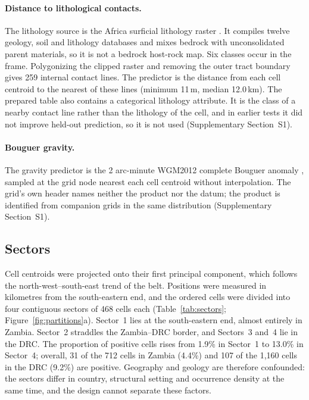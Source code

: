 \documentclass[pdflatex,sn-basic]{sn-jnl}%
\begin{document}
\paragraph{Distance to lithological contacts.}
The lithology source is the Africa surficial lithology raster \citep{SayreKabuchanga2015}. It compiles twelve geology, soil and lithology databases and mixes bedrock with unconsolidated parent materials, so it is not a bedrock host-rock map. Six classes occur in the frame. Polygonizing the clipped raster and removing the outer tract boundary gives 259 internal contact lines. The predictor is the distance from each cell centroid to the nearest of these lines (minimum 11\,m, median 12.0\,km). The prepared table also contains a categorical lithology attribute. It is the class of a nearby contact line rather than the lithology of the cell, and in earlier tests it did not improve held-out prediction, so it is not used (Supplementary Section~S1).

\paragraph{Bouguer gravity.}
The gravity predictor is the 2 arc-minute WGM2012 complete Bouguer anomaly \citep{BGIWGM2012}, sampled at the grid node nearest each cell centroid without interpolation. The grid's own header names neither the product nor the datum; the product is identified from companion grids in the same distribution (Supplementary Section~S1).

\subsection{Sectors}
\label{sec:sectors}

Cell centroids were projected onto their first principal component, which follows the north-west--south-east trend of the belt. Positions were measured in kilometres from the south-eastern end, and the ordered cells were divided into four contiguous sectors of 468 cells each (Table~\ref{tab:sectors}; Figure~\ref{fig:partitions}a). Sector~1 lies at the south-eastern end, almost entirely in Zambia. Sector~2 straddles the Zambia--DRC border, and Sectors~3 and~4 lie in the DRC. The proportion of positive cells rises from 1.9\% in Sector~1 to 13.0\% in Sector~4; overall, 31 of the 712 cells in Zambia (4.4\%) and 107 of the 1,160 cells in the DRC (9.2\%) are positive. Geography and geology are therefore confounded: the sectors differ in country, structural setting and occurrence density at the same time, and the design cannot separate these factors.
\end{document}
